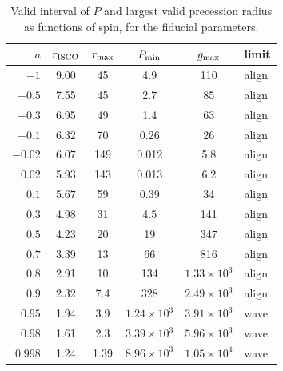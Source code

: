 \begin{table}
\caption{Valid interval of $P$ and largest valid precession radius as functions of spin, for the fiducial parameters.}
\label{tab:window}
\centering
\begin{tabular}{rccccl}
\hline\hline
$a$ & $r_\textup{ISCO}$ & $r_\textup{max}$ & $P_\textup{min}$ & $g_\textup{max}$ & limit \\
\hline
$-1$     & 9.00 & 45   & 4.9               & 110               & align \\
$-0.5$   & 7.55 & 45   & 2.7               & 85                & align \\
$-0.3$   & 6.95 & 49   & 1.4               & 63                & align \\
$-0.1$   & 6.32 & 70   & 0.26              & 26                & align \\
$-0.02$  & 6.07 & 149  & 0.012             & 5.8               & align \\
$0.02$   & 5.93 & 143  & 0.013             & 6.2               & align \\
$0.1$    & 5.67 & 59   & 0.39              & 34                & align \\
$0.3$    & 4.98 & 31   & 4.5               & 141               & align \\
$0.5$    & 4.23 & 20   & 19                & 347               & align \\
$0.7$    & 3.39 & 13   & 66                & 816               & align \\
$0.8$    & 2.91 & 10   & 134               & $1.33\times10^3$  & align \\
$0.9$    & 2.32 & 7.4  & 328               & $2.49\times10^3$  & align \\
$0.95$   & 1.94 & 3.9  & $1.24\times10^3$  & $3.91\times10^3$  & wave \\
$0.98$   & 1.61 & 2.3  & $3.39\times10^3$  & $5.96\times10^3$  & wave \\
$0.998$  & 1.24 & 1.39 & $8.96\times10^3$  & $1.05\times10^4$  & wave \\
\hline
\end{tabular}
\end{table}


